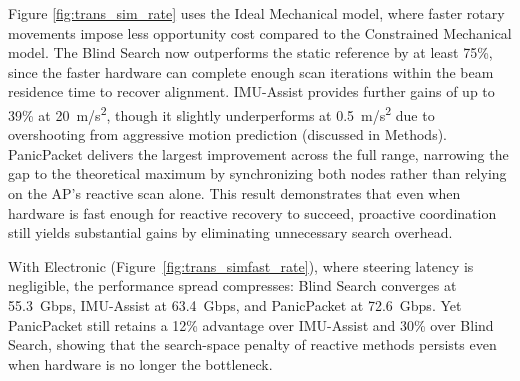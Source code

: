 \documentclass[fleqn,10pt]{wlscirep}
\begin{document}
Figure \ref{fig:trans_sim_rate} uses the Ideal Mechanical model, where faster rotary movements impose less opportunity cost compared to the Constrained Mechanical model. The Blind Search now outperforms the static reference by at least 75\%, since the faster hardware can complete enough scan iterations within the beam residence time to recover alignment. IMU-Assist provides further gains of up to 39\% at \SI{20}{m/s^2}, though it slightly underperforms at \SI{0.5}{m/s^2} due to overshooting from aggressive motion prediction (discussed in Methods). PanicPacket delivers the largest improvement across the full range, narrowing the gap to the theoretical maximum by synchronizing both nodes rather than relying on the AP's reactive scan alone. This result demonstrates that even when hardware is fast enough for reactive recovery to succeed, proactive coordination still yields substantial gains by eliminating unnecessary search overhead.

With Electronic (Figure~\ref{fig:trans_simfast_rate}), where steering latency is negligible, the performance spread compresses: Blind Search converges at \SI{55.3}{Gbps}, IMU-Assist at \SI{63.4}{Gbps}, and PanicPacket at \SI{72.6}{Gbps}. Yet PanicPacket still retains a 12\% advantage over IMU-Assist and 30\% over Blind Search, showing that the search-space penalty of reactive methods persists even when hardware is no longer the bottleneck.
\end{document}
